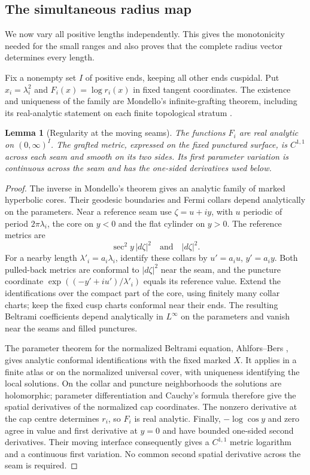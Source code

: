 \documentclass[11pt,a4paper]{article}
\newtheorem{lemma}[theorem]{Lemma}
\theoremstyle{definition}
\begin{document}
\subsection{The simultaneous radius map}
We now vary all positive lengths independently. This gives the monotonicity needed for the small ranges and also proves that the complete radius vector determines every length.

Fix a nonempty set $I$ of positive ends, keeping all other ends cuspidal. Put $x_i=\lambda_i^2$ and $F_i(x)=\log r_i(x)$ in fixed tangent coordinates. The existence and uniqueness of the family are Mondello's infinite-grafting theorem, including its real-analytic statement on each finite topological stratum \cite[Theorem~5.4, p.~660, and Remark~5.7, p.~661]{Mondello}.

\begin{lemma}[Regularity at the moving seams]\label{lem:radius-regularity}
The functions $F_i$ are real analytic on $(0,\infty)^I$. The grafted metric, expressed on the fixed punctured surface, is $C^{1,1}$ across each seam and smooth on its two sides. Its first parameter variation is continuous across the seam and has the one-sided derivatives used below.
\end{lemma}
\begin{proof}
The inverse in Mondello's theorem gives an analytic family of marked hyperbolic cores. Their geodesic boundaries and Fermi collars depend analytically on the parameters. Near a reference seam use $\zeta=u+iy$, with $u$ periodic of period $2\pi\lambda_i$, the core on $y<0$ and the flat cylinder on $y>0$. The reference metrics are
\[
 \sec^2 y\,|d\zeta|^2\quad\text{and}\quad |d\zeta|^2.
\]
For a nearby length $\lambda'_i=a_i\lambda_i$, identify these collars by $u'=a_i u$, $y'=a_i y$. Both pulled-back metrics are conformal to $|d\zeta|^2$ near the seam, and the puncture coordinate
$\exp((-y'+iu')/\lambda'_i)$ equals its reference value. Extend the identifications over the compact part of the core, using finitely many collar charts; keep the fixed cusp charts conformal near their ends. The resulting Beltrami coefficients depend analytically in $L^\infty$ on the parameters and vanish near the seams and filled punctures.

The parameter theorem for the normalized Beltrami equation, Ahlfors--Bers \cite[\S5.7, Theorems~10--11 and corollary, pp.~402--404]{AhlforsBers}, gives analytic conformal identifications with the fixed marked $X$. It applies in a finite atlas or on the normalized universal cover, with uniqueness identifying the local solutions. On the collar and puncture neighborhoods the solutions are holomorphic; parameter differentiation and Cauchy's formula therefore give the spatial derivatives of the normalized cap coordinates. The nonzero derivative at the cap centre determines $r_i$, so $F_i$ is real analytic. Finally, $-\log\cos y$ and zero agree in value and first derivative at $y=0$ and have bounded one-sided second derivatives. Their moving interface consequently gives a $C^{1,1}$ metric logarithm and a continuous first variation. No common second spatial derivative across the seam is required.
\end{proof}
\end{document}
